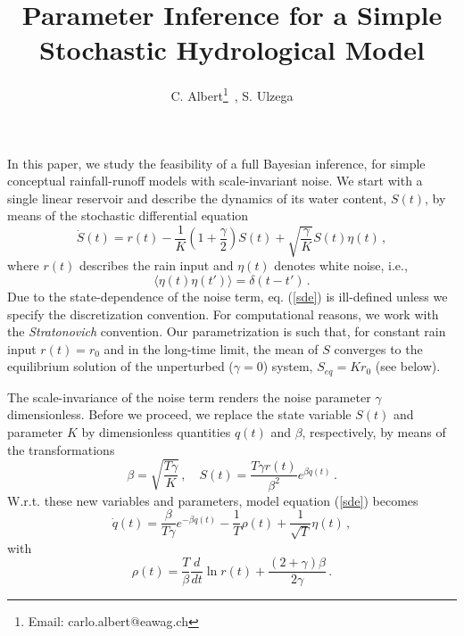 \documentclass[11pt, a4paper]{article}
\begin{document}
\title{Parameter Inference for a Simple Stochastic Hydrological Model}

\author{C. Albert\thanks{\noindent Email: carlo.albert@eawag.ch} \,,
S. Ulzega}
\maketitle

In this paper, we study the feasibility of a full Bayesian inference, for simple conceptual rainfall-runoff models with scale-invariant noise.
We start with a single linear reservoir and describe the dynamics of its water content, $S(t)$, by means of the stochastic differential equation
\begin{equation}\label{sde}
\dot{S}(t) = r(t) - \frac{1}{K}\left(1+\frac{\gamma}{2}\right) S(t)
+
\sqrt{\frac{\gamma}{K}} S(t){\eta}(t)\,,
\end{equation}
where $r(t)$ describes the rain input and $\eta(t)$ denotes white noise, i.e.,
\begin{equation}\label{whitenoise}
\langle\eta(t)\eta(t')\rangle = \delta(t-t')\,.
\end{equation}
Due to the state-dependence of the noise term, eq. (\ref{sde}) is ill-defined unless we specify the discretization convention.
For computational reasons, we work with the {\em Stratonovich} convention.
Our parametrization is such that, for constant rain input $r(t)=r_0$ and in the long-time limit, the mean of $S$ converges to the equilibrium solution of the unperturbed ($\gamma=0$) system, $S_{eq}=Kr_0$ (see below).

The scale-invariance of the noise term renders the noise parameter $\gamma$ dimensionless.
Before we proceed, we replace the state variable $S(t)$ and parameter $K$ by dimensionless quantities $q(t)$ and $\beta$, respectively, by means of the transformations
\begin{equation}
  \beta=\sqrt{\frac{T\gamma}{K}}\,,\quad
  S(t)=\frac{T\gamma r(t)}{\beta^2}e^{\beta q(t)}\,.
\end{equation}
W.r.t. these new  variables and parameters, model equation (\ref{sde}) becomes
\begin{equation}
  \dot q(t)
  =
  \frac{\beta}{T\gamma}e^{-\beta q(t)}
  -
  \frac{1}{T}\rho(t)
  +
  \frac{1}{\sqrt{T}}\eta(t)\,,
\end{equation}
with
\begin{equation}
  \rho(t)
  =
  \frac{T}{\beta}\frac{d}{dt}\ln r(t)
  +
  \frac{(2+\gamma)\beta}{2\gamma}\,.
\end{equation}
\end{document}
